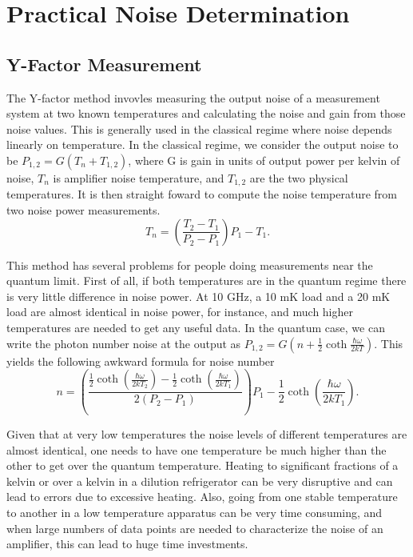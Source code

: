\documentclass{report}
\begin{document}


\section{Practical Noise Determination}
	\subsection{Y-Factor Measurement}

	The Y-factor method invovles measuring the output noise of a measurement system at two known temperatures and calculating the noise and gain from those noise values.  This is generally used in the classical regime where noise depends linearly on temperature.  In the classical regime, we consider the output noise to be $P_{1,2} = G(T_n + T_{1,2})$, where G is gain in units of output power per kelvin of noise, $T_n$ is amplifier noise temperature, and $T_{1,2}$ are the two physical temperatures.  It is then straight foward to compute the noise temperature from two noise power measurements.  
\begin{equation}
T_n = \left(\frac{T_2 - T_1}{P_2 - P_1}\right)P_1 - T_1.
\end{equation}

	This method has several problems for people doing measurements near the quantum limit.  First of all, if both temperatures are in the quantum regime there is very little difference in noise power.  At 10 GHz, a 10 mK load and a 20 mK load are almost identical in noise power, for instance, and much higher temperatures are needed to get any useful data.  In the quantum case, we can write the photon number noise at the output as $P_{1,2} = G(n + \frac{1}{2}\coth{\frac{\hbar\omega}{2kT}})$.  This yields the following awkward formula for noise number
\begin{equation}
n = \left(\frac{\frac{1}{2}\coth{\left(\frac{\hbar\omega}{2kT_2}\right)} - \frac{1}{2}\coth{\left(\frac{\hbar\omega}{2kT_1}\right)}}{2(P_2 - P_1)}\right)P_1 - \frac{1}{2}\coth{\left(\frac{\hbar\omega}{2kT_1}\right)}.
\end{equation}

	Given that at very low temperatures the noise levels of different temperatures are almost identical, one needs to have one temperature be much higher than the other to get over the quantum temperature.  Heating to significant fractions of a kelvin or over a kelvin in a dilution refrigerator can be very disruptive and can lead to errors due to excessive heating.  Also, going from one stable temperature to another in a low temperature apparatus can be very time consuming, and when large numbers of data points are needed to characterize the noise of an amplifier, this can lead to huge time investments.  
\end{document}
